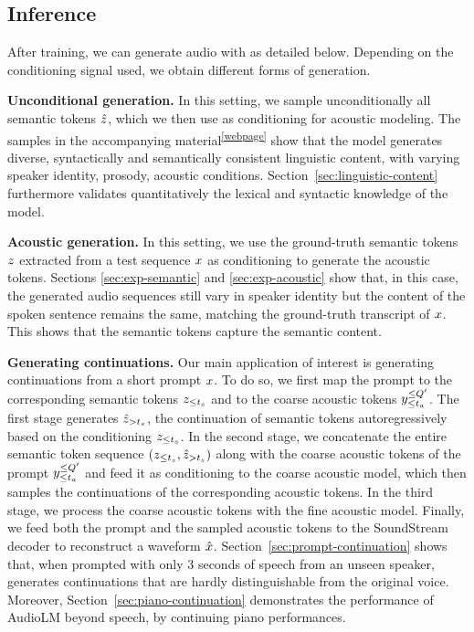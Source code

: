 \documentclass[letterpaper,10 pt]{IEEEtran}
\begin{document}
\subsection{Inference} \label{sec:model-inference}
After training, we can generate audio with \ours{} as detailed below. Depending on the conditioning signal used, we obtain different forms of generation. 

\noindent
\textbf{Unconditional generation.} In this setting, we sample unconditionally all semantic tokens $\hat{z}$, which we then use as conditioning for acoustic modeling. The samples in the accompanying material\textsuperscript{\ref{webpage}} show that the model generates diverse, syntactically and semantically consistent linguistic content, with varying speaker identity, prosody, acoustic conditions. Section~\ref{sec:linguistic-content} furthermore validates quantitatively the lexical and syntactic knowledge of the model.

\noindent
\textbf{Acoustic generation.} In this setting, we use the ground-truth semantic tokens $z$ extracted from a test sequence $x$ as conditioning to generate the acoustic tokens. Sections \ref{sec:exp-semantic} and \ref{sec:exp-acoustic} show that, in this case, the generated audio sequences still vary in speaker identity but the content of the spoken sentence remains the same, matching the ground-truth transcript of $x$. This shows that the semantic tokens capture the semantic content.

\noindent
\textbf{Generating continuations.} Our main application of interest is generating continuations from a short prompt $x$. To do so, we first map the prompt to the corresponding semantic tokens $z_{\leq t_s}$ and to the coarse acoustic tokens $y_{\leq t_a}^{\leq Q'}$. The first stage generates $\hat{z}_{>t_s}$, the continuation of semantic tokens autoregressively based on the conditioning $z_{\leq t_s}$. In the second stage, we concatenate the entire semantic token sequence $(z_{\leq t_s}, \hat{z}_{>t_s})$ along with the coarse acoustic tokens of the prompt $y_{\leq t_a}^{\leq Q'}$ and feed it as conditioning to the coarse acoustic model, which then samples the continuations of the corresponding acoustic tokens. In the third stage, we process the coarse acoustic tokens with the fine acoustic model. Finally, we feed both the prompt and the sampled acoustic tokens to the SoundStream decoder to reconstruct a waveform $\hat{x}$. Section~\ref{sec:prompt-continuation} shows that, when prompted with only 3 seconds of speech from an unseen speaker, \ours{} generates continuations that are hardly distinguishable from the original voice. Moreover, Section~\ref{sec:piano-continuation} demonstrates the performance of AudioLM beyond speech, by continuing piano performances.
\end{document}
